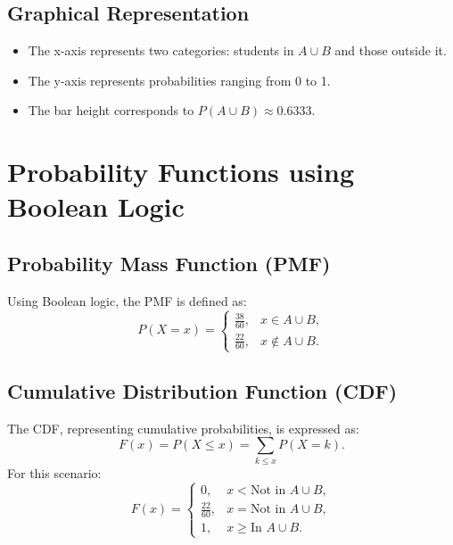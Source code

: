 \documentclass[journal]{IEEEtran}
\begin{document}
\subsection{Graphical Representation}
\begin{itemize}
    \item The x-axis represents two categories: students in $A \cup B$ and those outside it.
    \item The y-axis represents probabilities ranging from 0 to 1.
    \item The bar height corresponds to $P(A \cup B) \approx 0.6333$.
\end{itemize}

\section{\textbf{Probability Functions using Boolean Logic}}

\subsection{Probability Mass Function (PMF)}
Using Boolean logic, the PMF is defined as:
\begin{equation}
    P(X = x) = \begin{cases} 
    \frac{38}{60}, & x \in A \cup B, \\ 
    \frac{22}{60}, & x \notin A \cup B. 
    \end{cases}
\end{equation}

\subsection{Cumulative Distribution Function (CDF)}
The CDF, representing cumulative probabilities, is expressed as:
\begin{equation}
    F(x) = P(X \leq x) = \sum_{k \leq x} P(X = k).
\end{equation}
For this scenario:
\begin{equation}
    F(x) = \begin{cases} 
    0, & x < \text{Not in } A \cup B, \\ 
    \frac{22}{60}, & x = \text{Not in } A \cup B, \\ 
    1, & x \geq \text{In } A \cup B.
    \end{cases}
\end{equation}
\end{document}
